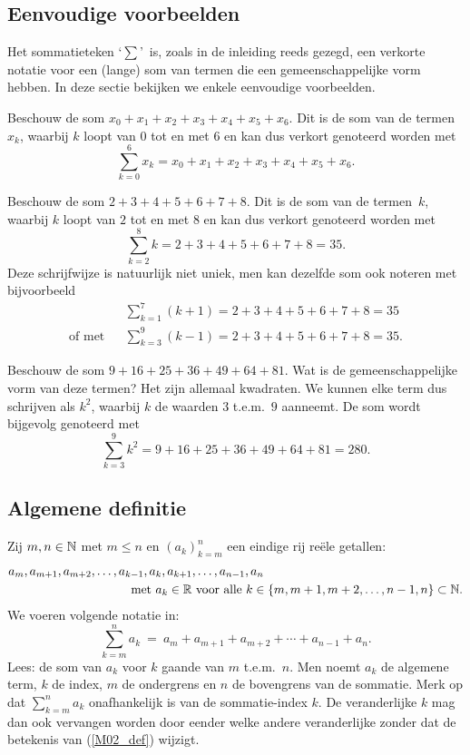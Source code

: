 \documentclass{ximera}
\begin{document}
\subsection{Eenvoudige voorbeelden}
Het sommatieteken \lq$\sum$\rq\ is, zoals in de inleiding reeds
gezegd, een verkorte notatie voor een (lange) som van termen die
een gemeenschappelijke vorm hebben. In deze sectie bekijken we
enkele eenvoudige voorbeelden.
\begin{example}
Beschouw de som $x_0+x_1+x_2+x_3+x_4+x_5+x_6$. Dit is de som van
de termen~$x_k$, waarbij $k$ loopt van $0$ tot en met $6$ en kan
dus verkort genoteerd worden met
\[\sum^{6}_{k=0}x_k=x_0+x_1+x_2+x_3+x_4+x_5+x_6.\]
\end{example}
\begin{example}
Beschouw de som $2+3+4+5+6+7+8$. Dit is de som van de termen~$k$, waarbij $k$ loopt van $2$ tot en met
$8$ en kan dus verkort genoteerd worden met\[\sum^{8}_{k=2}k=
2+3+4+5+6+7+8=35.\] Deze schrijfwijze is natuurlijk niet uniek,
men kan dezelfde som ook noteren met bijvoorbeeld
\begin{eqnarray*}
   &&\sum^{7}_{k=1}(k+1)=2+3+4+5+6+7+8=35  \\
   \textrm{of met}&&\sum^{9}_{k=3}(k-1)=
2+3+4+5+6+7+8=35.
\end{eqnarray*}
\end{example}
\begin{example}
Beschouw de som $9+16+25+36+49+64+81$. Wat is de
gemeenschappelijke vorm van deze termen? Het zijn allemaal
kwadraten. We kunnen elke term dus schrijven als $k^2$, waarbij
$k$ de waarden $3$ t.e.m.~$9$ aanneemt. De som wordt bijgevolg
genoteerd met\[\sum^{9}_{k=3}k^2=9+16+25+36+49+64+81=280.\]
\end{example}

\subsection{Algemene definitie}
\begin{notation}[sommatieteken]
Zij $m,n\in\mathbb{N}$ met $m\leqslant n$ en $(a_k)_{k=m}^n$ een eindige
rij re\"{e}le getallen:
\begin{align*}
&a_m,a_{m+1},a_{m+2},\ldots,a_{k-1},a_k,a_{k+1},\ldots,a_{n-1},a_n\\
&\qquad\qquad\qquad\qquad\qquad\textrm{met}\ a_k\in\mathbb{R}\
\textrm{voor alle}\ k\in\{m,m+1,m+2,\ldots,n-1,n\}\subset\mathbb{N}.
\end{align*}
We voeren volgende notatie in:
\begin{equation}\label{M02_def}
\sum_{k=m}^n a_k\ =\ a_m+a_{m+1}+a_{m+2}+\cdots +a_{n-1}+a_n.
\end{equation}
Lees: de som van $a_k$ voor $k$ gaande van $m$ t.e.m.~$n$. Men
noemt $a_k$ de algemene term, $k$ de index, $m$ de ondergrens en
$n$ de bovengrens van de sommatie. Merk op dat
$\sum\limits_{k=m}^n a_k$ onafhankelijk is van de sommatie-index
$k$. De veranderlijke $k$ mag dan ook vervangen worden door eender
welke andere veranderlijke zonder dat de betekenis van (\ref{M02_def})
wijzigt.
\end{notation}
\end{document}
